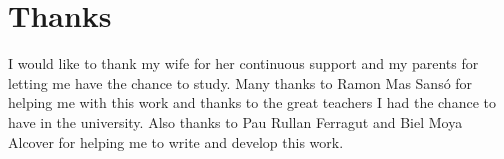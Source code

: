 \chapter{Thanks}
I would like to thank my wife for her continuous support and my parents for letting me
have the chance to study. Many thanks to Ramon Mas Sansó for helping me with this work
and thanks to the great teachers I had the chance to have in the university. 
Also thanks to Pau Rullan Ferragut and Biel Moya Alcover for helping me to write and
develop this work.
